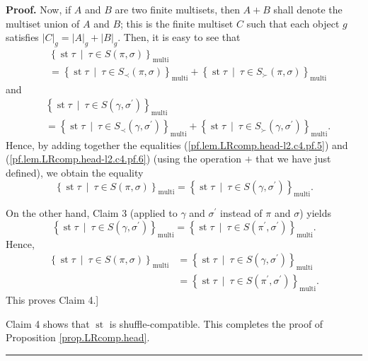 \documentclass[numbers=enddot,12pt,final,onecolumn,notitlepage]{scrartcl}%
\theoremstyle{definition}
\newenvironment{proof}[1][Proof]{\noindent\textbf{#1.} }{\ \rule{0.5em}{0.5em}}
\newenvironment{verlong}{}{}
\begin{document}
\begin{verlong}
\begin{proof}
Now, if $A$ and $B$ are two finite multisets, then $A+B$ shall denote the
multiset union of $A$ and $B$; this is the finite multiset $C$ such that
each object
$g$ satisfies $\left\vert C\right\vert _{g}=\left\vert A\right\vert
_{g}+\left\vert B\right\vert _{g}$. Then, it is easy to see that%
\begin{align*}
&  \left\{  \operatorname{st} \tau   \ \mid\ \tau\in S\left(
\pi,\sigma\right)  \right\}  _{\operatorname*{multi}}\\
&  =\left\{  \operatorname{st} \tau   \ \mid\ \tau\in S_{\prec
}\left(  \pi,\sigma\right)  \right\}  _{\operatorname*{multi}}+\left\{
\operatorname{st} \tau   \ \mid\ \tau\in S_{\succ}\left(
\pi,\sigma\right)  \right\}  _{\operatorname*{multi}}%
\end{align*}
and
\begin{align*}
&  \left\{  \operatorname{st} \tau   \ \mid\ \tau\in S\left(
\gamma,\sigma^{\prime}\right)  \right\}  _{\operatorname*{multi}}\\
&  =\left\{  \operatorname{st} \tau   \ \mid\ \tau\in S_{\prec
}\left(  \gamma,\sigma^{\prime}\right)  \right\}  _{\operatorname*{multi}%
}+\left\{  \operatorname{st} \tau   \ \mid\ \tau\in S_{\succ
}\left(  \gamma,\sigma^{\prime}\right)  \right\}  _{\operatorname*{multi}}.
\end{align*}
Hence, by adding together the equalities (\ref{pf.lem.LRcomp.head-l2.c4.pf.5})
and (\ref{pf.lem.LRcomp.head-l2.c4.pf.6}) (using the operation $+$ that we
have just defined), we obtain the equality%
\[
\left\{  \operatorname{st} \tau   \ \mid\ \tau\in S\left(
\pi,\sigma\right)  \right\}  _{\operatorname*{multi}}=\left\{
\operatorname{st} \tau   \ \mid\ \tau\in S\left(  \gamma
,\sigma^{\prime}\right)  \right\}  _{\operatorname*{multi}}.
\]


On the other hand, Claim 3 (applied to $\gamma$ and $\sigma^{\prime}$ instead
of $\pi$ and $\sigma$) yields%
\[
\left\{  \operatorname{st} \tau   \ \mid\ \tau\in S\left(
\gamma,\sigma^{\prime}\right)  \right\}  _{\operatorname*{multi}}=\left\{
\operatorname{st} \tau   \ \mid\ \tau\in S\left(  \pi^{\prime
},\sigma^{\prime}\right)  \right\}  _{\operatorname*{multi}}.
\]
Hence,%
\begin{align*}
\left\{  \operatorname{st} \tau   \ \mid\ \tau\in S\left(
\pi,\sigma\right)  \right\}  _{\operatorname*{multi}}  &  =\left\{
\operatorname{st} \tau   \ \mid\ \tau\in S\left(  \gamma
,\sigma^{\prime}\right)  \right\}  _{\operatorname*{multi}}\\
&  =\left\{  \operatorname{st} \tau   \ \mid\ \tau\in S\left(
\pi^{\prime},\sigma^{\prime}\right)  \right\}  _{\operatorname*{multi}}.
\end{align*}
This proves Claim 4.]

Claim 4 shows that $\operatorname{st}$ is shuffle-compatible. This completes
the proof of Proposition \ref{prop.LRcomp.head}.
\end{proof}
\end{verlong}
\end{document}
